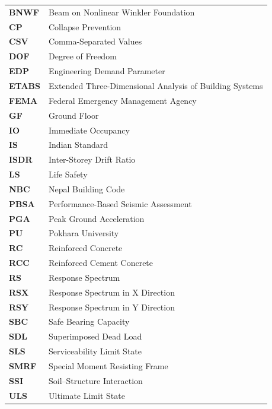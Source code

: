 \begin{titlepage}
    {\fontsize{12}{14}\selectfont
    \noindent
    \begin{tabular}{@{}p{2.8cm}p{11.0cm}@{}}
        \textbf{BNWF}  & Beam on Nonlinear Winkler Foundation \\[0.5ex]
        \textbf{CP}    & Collapse Prevention \\[0.5ex]
        \textbf{CSV}   & Comma-Separated Values \\[0.5ex]
        \textbf{DOF}   & Degree of Freedom \\[0.5ex]
        \textbf{EDP}   & Engineering Demand Parameter \\[0.5ex]
        \textbf{ETABS} & Extended Three-Dimensional Analysis of Building Systems \\[0.5ex]
        \textbf{FEMA}  & Federal Emergency Management Agency \\[0.5ex]
        \textbf{GF}    & Ground Floor \\[0.5ex]
        \textbf{IO}    & Immediate Occupancy \\[0.5ex]
        \textbf{IS}    & Indian Standard \\[0.5ex]
        \textbf{ISDR}  & Inter-Storey Drift Ratio \\[0.5ex]
        \textbf{LS}    & Life Safety \\[0.5ex]
        \textbf{NBC}   & Nepal Building Code \\[0.5ex]
        \textbf{PBSA}  & Performance-Based Seismic Assessment \\[0.5ex]
        \textbf{PGA}   & Peak Ground Acceleration \\[0.5ex]
        \textbf{PU}    & Pokhara University \\[0.5ex]
        \textbf{RC}    & Reinforced Concrete \\[0.5ex]
        \textbf{RCC}   & Reinforced Cement Concrete \\[0.5ex]
        \textbf{RS}    & Response Spectrum \\[0.5ex]
        \textbf{RSX}   & Response Spectrum in X Direction \\[0.5ex]
        \textbf{RSY}   & Response Spectrum in Y Direction \\[0.5ex]
        \textbf{SBC}   & Safe Bearing Capacity \\[0.5ex]
        \textbf{SDL}   & Superimposed Dead Load \\[0.5ex]
        \textbf{SLS}   & Serviceability Limit State \\[0.5ex]
        \textbf{SMRF}  & Special Moment Resisting Frame \\[0.5ex]
        \textbf{SSI}   & Soil--Structure Interaction \\[0.5ex]
        \textbf{ULS}   & Ultimate Limit State \\[0.5ex]
    \end{tabular}
    }

\end{titlepage}